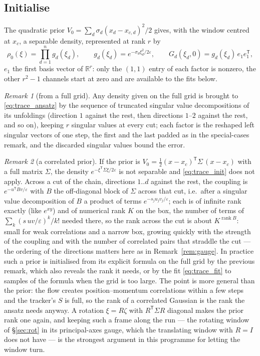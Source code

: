 \documentclass[11pt,a4paper]{article}
\newcommand{\R}{\mathbb{R}}
\newcommand{\T}{^{\mathsf T}}
\newcommand{\eps}{\varepsilon}
\theoremstyle{plain}
\theoremstyle{definition}
\theoremstyle{remark}
\newtheorem{remark}{Remark}
\begin{document}
\subsection{Initialise}

The quadratic prior $V_0=\sum_d\sigma_d(x_d-x_{c,d})^2/2$ gives, with the window centred at $x_c$, a separable density, represented at rank $r$ by
\begin{equation}
  \rho_0(\xi) = \prod_{d=1}^ng_d(\xi_d), \qquad g_d(\xi_d)=e^{-\sigma_d\xi_d^2/2\eps}, \qquad
  G_d(\xi_d,0) = g_d(\xi_d)\,e_1e_1\T ,
  \label{eq:trace_init}
\end{equation}
$e_1$ the first basis vector of $\R^r$: only the $(1,1)$ entry of each factor is nonzero, the other $r^2-1$ channels start at zero and are available to the fits below.

\begin{remark}[from a full grid]
Any density given on the full grid is brought to \eqref{eq:trace_ansatz} by the sequence of truncated singular value decompositions of its unfoldings (direction $1$ against the rest, then directions $1$--$2$ against the rest, and so on), keeping $r$ singular values at every cut; each factor is the reshaped left singular vectors of one step, the first and the last padded as in the special-cases remark, and the discarded singular values bound the error.
\end{remark}

\begin{remark}[a correlated prior]
\label{rem:trace_corr}
If the prior is $V_0=\tfrac12(x-x_c)\T\Sigma\,(x-x_c)$ with a full matrix $\Sigma$, the density $e^{-\xi\T\Sigma\xi/2\eps}$ is not separable and \eqref{eq:trace_init} does not apply. Across a cut of the chain, directions $1..d$ against the rest, the coupling is $e^{-u\T Bv/\eps}$ with $B$ the off-diagonal block of $\Sigma$ across that cut, i.e.\ after a singular value decomposition of $B$ a product of terms $e^{-s_ju_jv_j/\eps}$; each is of infinite rank exactly (like $e^{xy}$) and of numerical rank $K$ on the box, the number of terms of $\sum_k(s\,uv/\eps)^k/k!$ needed there, so the rank across the cut is about $K^{\operatorname{rank}B}$: small for weak correlations and a narrow box, growing quickly with the strength of the coupling and with the number of correlated pairs that straddle the cut --- the ordering of the directions matters here as in Remark~\ref{rem:gauge}. In practice such a prior is initialised from its explicit formula on the full grid by the previous remark, which also reveals the rank it needs, or by the fit \eqref{eq:trace_fit} to samples of the formula when the grid is too large. The point is more general than the prior: the flow creates position--momentum correlations within a few steps and the tracker's $S$ is full, so the rank of a correlated Gaussian is the rank the ansatz needs anyway. A rotation $\xi=R\zeta$ with $R\T\Sigma R$ diagonal makes the prior rank one again, and keeping such a frame along the run --- the rotating window of \S\ref{sec:rot} in its principal-axes gauge, which the translating window with $R=I$ does not have --- is the strongest argument in this programme for letting the window turn.
\end{remark}
\end{document}
